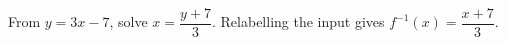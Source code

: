 From $y=3x-7$, solve $x=\dfrac{y+7}{3}$. Relabelling the input gives $\boxed{f^{-1}(x)=\dfrac{x+7}{3}}$.

